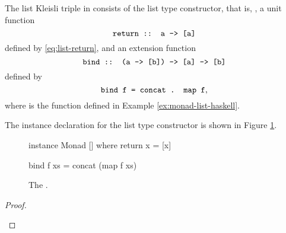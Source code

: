 \begin{example}
  \label{ex:triple-list-haskell}

  The list Kleisli triple in \hask consists of the list type
  constructor, that is, \texthaskell{[]}, a unit function
  \begin{equation*}
    \text{\texttt{return :: a -> [a]}}
  \end{equation*}
  defined by \eqref{eq:list-return}, and an extension function
  \begin{equation*}
    \text{\texttt{bind :: (a -> [b]) -> [a] -> [b]}}
  \end{equation*}
  defined by
  \begin{equation}
    \label{eq:list-bind}
    \text{\texttt{bind f = concat . map f}}
    \text{,}
  \end{equation}
  where  is the function defined in Example
  \ref{ex:monad-list-haskell}.

  The instance declaration for the list type constructor is shown in
  Figure \ref{fig:triple-list-haskell}.

  \begin{figure}[htbp]
    \begin{codehaskell}
instance Monad [] where
  return x = [x]

  bind f xs = concat (map f xs)
    \end{codehaskell}
    \caption{The \texthaskell{[]} .}
    \label{fig:triple-list-haskell}
  \end{figure}

  \begin{proof}

    \hfill
    \begin{steps}
      \steph{[]}
    \end{steps}

    \begin{steps}
        \eqbyih
        \eqbydefh{(++)}
    \end{steps}

  \end{proof}

\end{example}

